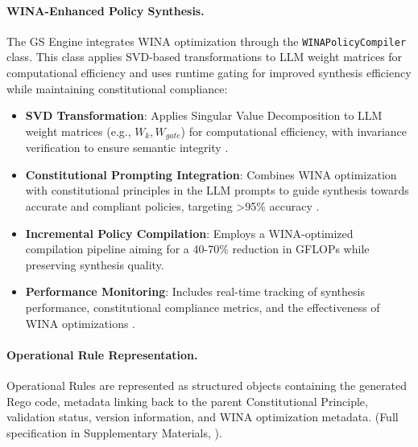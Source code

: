 \documentclass[manuscript,screen,review,anonymous,9pt]{acmart}
\begin{document}
\paragraph{WINA-Enhanced Policy Synthesis.} The GS Engine integrates WINA optimization through the \texttt{WINAPolicyCompiler} class. This class applies SVD-based transformations to LLM weight matrices for computational efficiency and uses runtime gating for improved synthesis efficiency while maintaining constitutional compliance:
\begin{itemize}[leftmargin=*,itemsep=1pt,parsep=1pt]
    \item \textbf{SVD Transformation}: Applies Singular Value Decomposition to LLM weight matrices (e.g., $W_k, W_{gate}$) for computational efficiency, with invariance verification to ensure semantic integrity \cite{SVDOptimization2024}.
    \item \textbf{Constitutional Prompting Integration}: Combines WINA optimization with constitutional principles in the LLM prompts to guide synthesis towards accurate and compliant policies, targeting >95\% accuracy \cite{ConstitutionalCompliance2024}.
    \item \textbf{Incremental Policy Compilation}: Employs a WINA-optimized compilation pipeline aiming for a 40-70\% reduction in GFLOPs while preserving synthesis quality.
    \item \textbf{Performance Monitoring}: Includes real-time tracking of synthesis performance, constitutional compliance metrics, and the effectiveness of WINA optimizations \cite{PerformanceMonitoring2024}.
\end{itemize}

\paragraph{Operational Rule Representation.} Operational Rules are represented as structured objects containing the generated Rego code, metadata linking back to the parent Constitutional Principle, validation status, version information, and WINA optimization metadata. (Full specification in Supplementary Materials, ).
\end{document}
